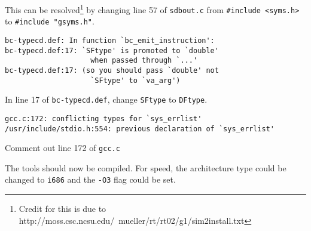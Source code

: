 This can be resolved\footnote{Credit for this is due to
http://moss.csc.ncsu.edu/~mueller/rt/rt02/g1/sim2install.txt} by changing line
57 of \texttt{sdbout.c} from \verb!#include <syms.h>! to \verb!#include "gsyms.h"!.

\begin{verbatim}
bc-typecd.def: In function `bc_emit_instruction':
bc-typecd.def:17: `SFtype' is promoted to `double' 
					when passed through `...'
bc-typecd.def:17: (so you should pass `double' not 
					`SFtype' to `va_arg')
\end{verbatim}

In line 17 of \texttt{bc-typecd.def}, change \texttt{SFtype} to \texttt{DFtype}.

\begin{verbatim}
gcc.c:172: conflicting types for `sys_errlist'
/usr/include/stdio.h:554: previous declaration of `sys_errlist'
\end{verbatim}

Comment out line 172 of \texttt{gcc.c}

The tools should now be compiled. For speed, the architecture type could be
changed to \texttt{i686} and the \texttt{-O3} flag could be set.
